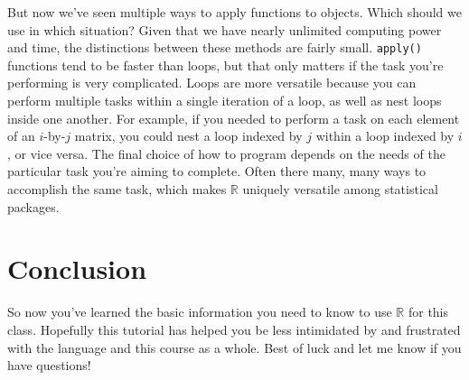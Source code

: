 \documentclass[12pt]{article}
\begin{document}
But now we've seen multiple ways to apply functions to objects. Which should we use in which situation? Given that we have nearly unlimited computing power and time, the distinctions between these methods are fairly small. \verb|apply()| functions tend to be faster than loops, but that only matters if the task you're performing is very complicated. Loops are more versatile because you can perform multiple tasks within a single iteration of a loop, as well as nest loops inside one another. For example, if you needed to perform a task on each element of an $i$-by-$j$ matrix, you could nest a loop indexed by $j$ within a loop indexed by $i$, or vice versa. The final choice of how to program depends on the needs of the particular task you're aiming to complete. Often there many, many ways to accomplish the same task, which makes $\mathbb{R}$ uniquely versatile among statistical packages.

\section{Conclusion}\label{sec:conclusion}
So now you've learned the basic information you need to know to use $\mathbb{R}$ for this class. Hopefully this tutorial has helped you be less intimidated by and frustrated with the language and this course as a whole. Best of luck and let me know if you have questions!






%
%





\end{document}
